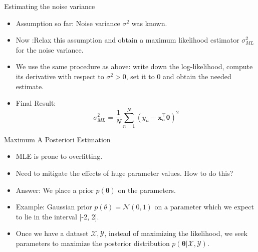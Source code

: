 \documentclass{beamer}
\begin{document}
\begin{frame}{Estimating the noise variance}
\begin{itemize}[<+->]
\item Assumption so far: Noise variance $\sigma^{2}$ was known.
\item Now :Relax this assumption and obtain a maximum likelihood estimator $\sigma^{2}_{ML}$ for the noise variance.
\item We use the same procedure as above: write down the log-likelihood, compute its derivative with respect to $\sigma^{2} > 0$, set it to 0 and obtain the needed estimate.
\item Final Result: 
\begin{equation*}
    \sigma_{ML}^{2} = \frac{1}{N}\sum_{n=1}^{N}(y_n - \boldsymbol{x}_n^{\top}\boldsymbol{\theta})^{2}
\end{equation*}
 \end{itemize}
\end{frame}

\begin{frame}{Maximum A Posteriori Estimation}
\begin{itemize}[<+->]
\item MLE is prone to overfitting.
\item Need to mitigate the effects of huge parameter values. How to do this?
\item Answer: We place a prior $p(\boldsymbol{\theta})$ on the parameters.
\item Example: Gaussian prior $p(\theta) = \mathcal{N}(0, 1)$ on a parameter which we expect to lie in the interval [-2, 2]. 
\item Once we have a dataset $\mathcal{X}, \mathcal{Y}$, instead of maximizing the likelihood, we seek parameters to maximize the posterior distribution $p(\boldsymbol{\theta}|\mathcal{X}, \mathcal{Y})$.
\end{itemize}
\end{frame}
\end{document}
